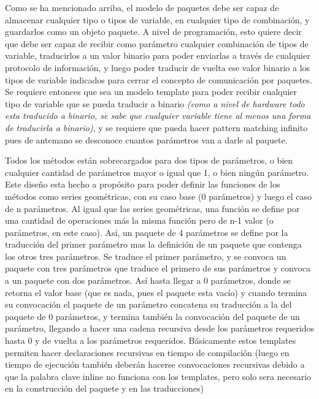 \documentclass{report}
\begin{document}
Como se ha mencionado arriba, el modelo de paquetes debe ser capaz de almacenar cualquier tipo o tipos de variable, en cualquier tipo de combinación, y guardarlos como un objeto paquete. A nivel de programación, esto quiere decir que debe ser capaz de recibir como parámetro cualquier combinación de tipos de variable, traducirlos a un valor binario para poder enviarlas a través de cualquier protocolo de información, y luego poder traducir de vuelta ese valor binario a los tipos de variable indicados para cerrar el concepto de comunicación por paquetes. Se requiere entonces que sea un modelo template para poder recibir cualquier tipo de variable que se pueda traducir a binario \textit{(como a nivel de hardware todo esta traducido a binario, se sabe que cualquier variable tiene al menos una forma de traducirla a binario)}, y se requiere que pueda hacer pattern matching infinito pues de antemano se desconoce cuantos parámetros van a darle al paquete. \par \vspace{0.3 cm}
Todos los métodos están sobrecargados para dos tipos de parámetros, o bien cualquier cantidad de parámetros mayor o igual que 1, o bien ningún parámetro. Este diseño esta hecho a propósito para poder definir las funciones de los métodos como series geométricas, con su caso base (0 parámetros) y luego el caso de n parámetros. Al igual que las series geométricas, una función se define por una cantidad de operaciones más la misma función pero de n-1 valor (o parámetros, en este caso). Así, un paquete de 4 parámetros se define por la traducción del primer parámetro mas la definición de un paquete que contenga los otros tres parámetros. Se traduce el primer parámetro, y se convoca un paquete con tres parámetros que traduce el primero de sus parámetros y convoca a un paquete con dos parámetros. Así hasta llegar a 0 parámetros, donde se retorna el valor base (que es nada, pues el paquete esta vacío) y cuando termina su convocación el paquete de un parámetro concatena su traducción a la del paquete de 0 parámetros, y termina también la convocación del paquete de un parámetro, llegando a hacer una cadena recursiva desde los parámetros requeridos hasta 0 y de vuelta a los parámetros requeridos. Básicamente estos templates permiten hacer declaraciones recursivas en tiempo de compilación (luego en tiempo de ejecución también deberán hacerse convocaciones recursivas debido a que la palabra clave inline no funciona con los templates, pero solo sera necesario en la construcción del paquete y en las traducciones)
\par \vspace{0.3 cm}
\end{document}

